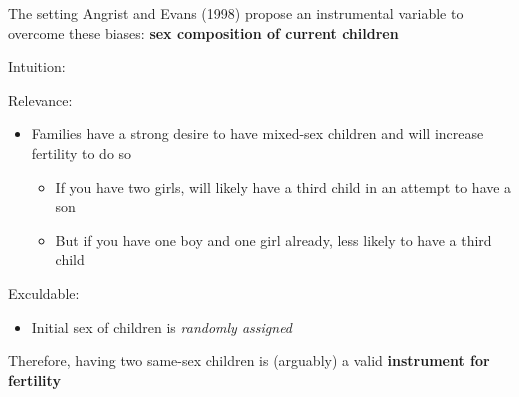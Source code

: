 \documentclass[
  ignorenonframetext,
]{beamer}
\providecommand{\tightlist}{%
  \setlength{\itemsep}{0pt}\setlength{\parskip}{0pt}}
\begin{document}
\begin{frame}{The setting}
\label{the-setting-2}
Angrist and Evans (1998) propose an instrumental variable to overcome
these biases: \textbf{sex composition of current children}

Intuition:

Relevance:

\begin{itemize}
\tightlist
\item
  Families have a strong desire to have mixed-sex children and will
  increase fertility to do so

  \begin{itemize}
  \tightlist
  \item
    If you have two girls, will likely have a third child in an attempt
    to have a son
  \item
    But if you have one boy and one girl already, less likely to have a
    third child
  \end{itemize}
\end{itemize}

Exculdable:

\begin{itemize}
\tightlist
\item
  Initial sex of children is \emph{randomly assigned}
\end{itemize}

Therefore, having two same-sex children is (arguably) a valid
\textbf{instrument for fertility}
\end{frame}
\end{document}
